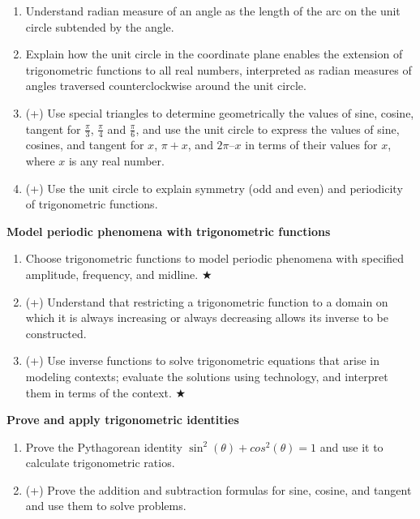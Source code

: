 \documentclass[12pt]{article}
\begin{document}
\begin{enumerate}


\item Understand radian measure of an angle as the length of the arc on the
unit circle subtended by the angle.

\item Explain how the unit circle in the coordinate plane enables the
extension of trigonometric functions to all real numbers, interpreted as
radian measures of angles traversed counterclockwise around the unit
circle.

\item (+) Use special triangles to determine geometrically the values of sine,
cosine, tangent for $\frac{\pi}{3}$, $\frac{\pi}{4}$ and $\frac{\pi}{6}$, and use the unit circle to express
the values of sine, cosines, and tangent for $x$, $π+x$, and $2π–x$ in terms of
their values for $x$, where $x$ is any real number.

\item (+) Use the unit circle to explain symmetry (odd and even) and
periodicity of trigonometric functions.

\end{enumerate}

\textbf{Model periodic phenomena with trigonometric functions}\\

\begin{enumerate}[resume]

\item Choose trigonometric functions to model periodic phenomena with
specified amplitude, frequency, and midline. ★

\item (+) Understand that restricting a trigonometric function to a domain
on which it is always increasing or always decreasing allows its inverse
to be constructed.

\item (+) Use inverse functions to solve trigonometric equations that arise
in modeling contexts; evaluate the solutions using technology, and
interpret them in terms of the context. ★\\

\end{enumerate}

\textbf{Prove and apply trigonometric identities}\\

\begin{enumerate}[resume]

\item Prove the Pythagorean identity $\sin^2(\theta) + cos^2 (\theta) = 1$ and use it to calculate trigonometric ratios.

\item (+) Prove the addition and subtraction formulas for sine, cosine, and tangent and use them to solve problems.

\end{enumerate}
\end{document}
